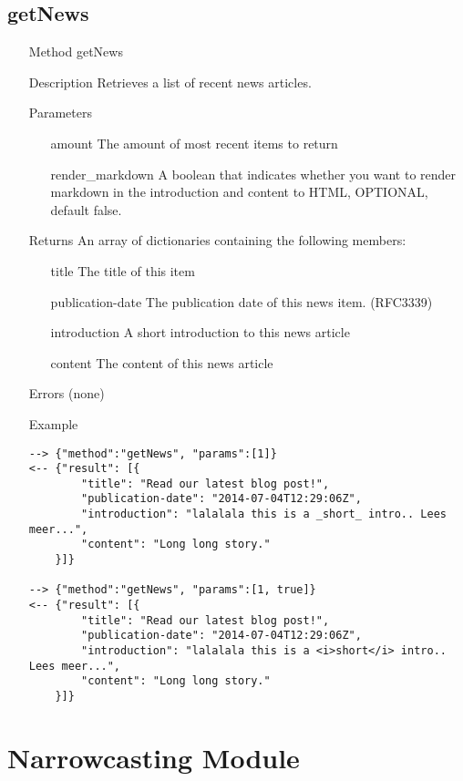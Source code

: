 \documentclass[a4paper]{scrreprt}
\begin{document}
\clearpage

\subsection{getNews}
\begin{enumerate}
\item[Method] getNews
\item[Description] Retrieves a list of recent news articles.
\item[Parameters] 
    \begin{enumerate}
        \item[amount] The amount of most recent items to return
        \item[render\_markdown] A boolean that indicates whether you want to render markdown in the introduction and content to HTML, OPTIONAL, default false.
    \end{enumerate}

\item[Returns] An array of dictionaries containing the following members:
\begin{enumerate}
    \item[title] The title of this item
	\item[publication-date] The publication date of this news item. (RFC3339)
    \item[introduction] A short introduction to this news article
    \item[content] The content of this news article
	\end{enumerate}
\item[Errors] (none)
\item[Example]
\begin{lstlisting}
--> {"method":"getNews", "params":[1]}
<-- {"result": [{
        "title": "Read our latest blog post!", 
        "publication-date": "2014-07-04T12:29:06Z", 
        "introduction": "lalalala this is a _short_ intro.. Lees meer...", 
        "content": "Long long story." 
    }]}

--> {"method":"getNews", "params":[1, true]}
<-- {"result": [{
        "title": "Read our latest blog post!", 
        "publication-date": "2014-07-04T12:29:06Z", 
        "introduction": "lalalala this is a <i>short</i> intro.. Lees meer...", 
        "content": "Long long story." 
    }]}
\end{lstlisting}
\end{enumerate}

\section{Narrowcasting Module}
\end{document}
